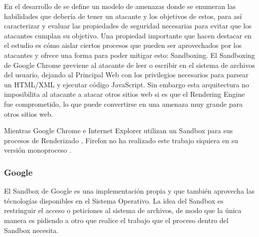     En el desarrollo de \cite{barth2008security} se define un modelo de amenazas donde se enumeran las habilidades que debería de tener un atacante y los objetivos de estos, para así caracterizar y evaluar las propiedades de seguridad necesarias para evitar que los atacantes cumplan su objetivo. Una propiedad importante que hacen destacar en el estudio es cómo aislar ciertos procesos que pueden ser aprovechados por los atacantes y ofrece una forma para poder mitigar esto: Sandboxing. El Sandboxing de Google Chrome previene al atacante de leer o escribir en el sistema de archivos del usuario, dejando al Principal Web con los privilegios necesarios para parsear un HTML/XML y ejecutar código JavaScript. Sin embargo esta arquitectura no imposibilita al atacante a atacar otros sitios web si es que el Rendering Engine fue comprometido, lo que puede convertirse en una amenaza muy grande para otros sitios web.

    Mientras Google Chrome e Internet Explorer utilizan un Sandbox para sus procesos de Renderizado \cite{sandboxGC}, Firefox no ha realizado este trabajo siquiera en su versión monoproceso \cite{NeckoElectro}.



    \subsubsection{Google}
        El Sandbox de Google es una implementación propia y que también aprovecha las técnologías disponibles en el Sistema Operativo. La idea del Sandbox es restringuir el acceso o peticiones al sistema de archivos, de modo que la única manera es pidiendo a otro que realice el trabajo que el proceso dentro del Sandbox necesita.

